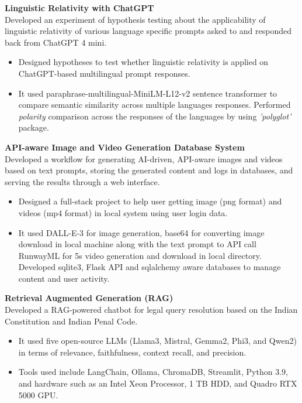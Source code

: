 \documentclass[10pt,a4paper]{article}
\begin{document}
	\textbf{Linguistic Relativity with ChatGPT} \hfill \textit{}\\
	Developed an experiment of hypothesis testing about the applicability of linguistic relativity of various language specific prompts asked to and responded back from ChatGPT 4 mini.
	\begin{itemize}[leftmargin=0.2in]
		\item Designed hypotheses to test whether linguistic relativity is applied on ChatGPT-based multilingual prompt responses.
		\item It used paraphrase-multilingual-MiniLM-L12-v2 sentence transformer to compare semantic similarity across multiple languages responses. Performed \textit{polarity} comparison across the responses of the languages by using \textit{'polyglot'} package. 
		
	\end{itemize}
	
	\textbf{API-aware Image and Video Generation Database System} \hfill \textit{}\\
	Developed a workflow for generating AI-driven, API-aware images and videos based on text prompts, storing the generated content and logs in databases, and serving the results through a web interface.
	\begin{itemize}[leftmargin=0.2in]
		\item Designed a full-stack project to help user getting image (png format) and videos (mp4 format) in local system using user login data.
		\item It used DALL-E-3 for image generation, base64 for converting image download in local machine along with the text prompt to API call RunwayML for 5s video generation and download in local directory. Developed sqlite3, Flask API and sqlalchemy aware databases to manage content and user activity. 
		
	\end{itemize}
	
	\textbf{Retrieval Augmented Generation (RAG)} \hfill \textit{}\\
	Developed a RAG-powered chatbot for legal query resolution based on the Indian Constitution and Indian Penal Code.
	\begin{itemize}[leftmargin=0.2in]
		\item It used five open-source LLMs (Llama3, Mistral, Gemma2, Phi3, and Qwen2) in terms of relevance, faithfulness, context recall, and precision. 
		\item Tools used include LangChain, Ollama, ChromaDB, Streamlit, Python 3.9, and hardware such as an Intel Xeon Processor, 1 TB HDD, and Quadro RTX 5000 GPU. 
		
	\end{itemize}
	
\end{document}
